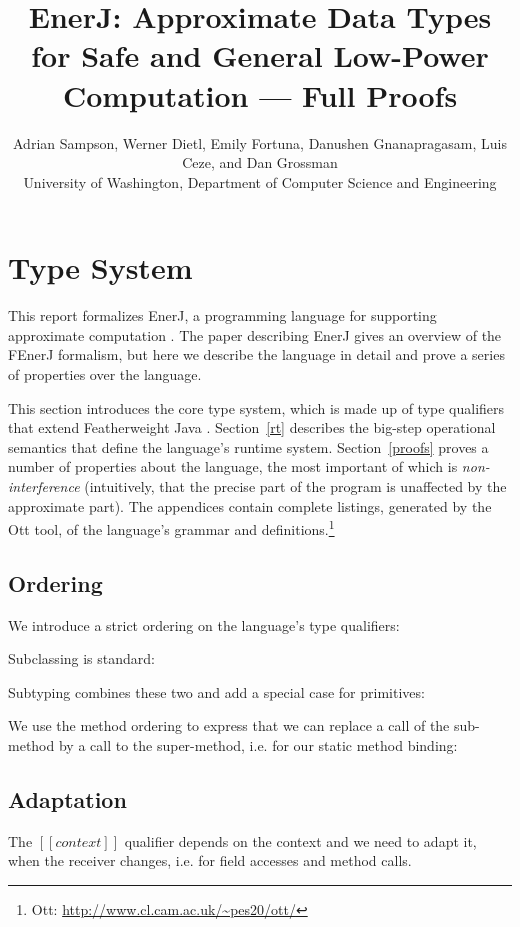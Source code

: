 \documentclass[final,10pt,twoside]{article}
\title{EnerJ: Approximate Data Types for Safe and General Low-Power
Computation --- Full Proofs}
\author{Adrian Sampson, Werner Dietl, Emily Fortuna, Danushen Gnanapragasam,
Luis Ceze, and Dan Grossman\\
University of Washington, Department of Computer Science and Engineering}
\begin{document}
\maketitle


\section{Type System}
\label{typesystem}

This report formalizes EnerJ, a programming language for supporting approximate
computation \cite{enerj}. The paper describing EnerJ gives an overview of the
FEnerJ formalism, but here we describe the language in detail and prove a series
of properties over the language.

This section introduces the core type system, which is made up of type
qualifiers that extend Featherweight Java \cite{fjava}. Section~\ref{rt}
describes the big-step operational semantics that define the language's runtime
system. Section~\ref{proofs} proves a number of properties about the language,
the most important of which is \emph{non-interference} (intuitively, that the
precise part of the program is unaffected by the approximate part). The
appendices contain complete listings, generated by the Ott tool,
of the language's grammar and
definitions.\footnote{Ott: \url{http://www.cl.cam.ac.uk/~pes20/ott/}}


\subsection{Ordering}

We introduce a strict ordering on the language's type qualifiers:

\ottdefnqorder


Subclassing is standard:

\ottdefnsubclassing


Subtyping combines these two and add a special case for primitives:

\ottdefnsubtyping


We use the method ordering to express that we can replace a call of
the sub-method by a call to the super-method, i.e. for our static
method binding:

\ottdefnmethodsubtyping


\subsection{Adaptation}

The $[[context]]$ qualifier depends on the context and we need to
adapt it, when the receiver changes, i.e. for field accesses and
method calls.
\end{document}

